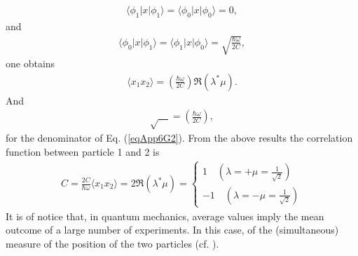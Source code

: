\begin{subappendices}
\begin{align}\label{eqApp6G4}
\langle\phi_1|x|\phi_1\rangle=\langle\phi_0|x|\phi_0\rangle=0,
\end{align} 
and
\begin{align}\label{eqApp6G5}
\langle\phi_0|x|\phi_1\rangle=\langle\phi_1|x|\phi_0\rangle=\sqrt{\frac{\hbar\omega}{2C}},
\end{align}
one obtains
\begin{align}\label{eqApp6G6}
\langle x_1x_2\rangle=\left(\frac{\hbar\omega}{2C}\right)\Re(\lambda^*\mu).
\end{align} 
And 
\begin{align}\label{eqApp6G7}
\sqrt{\quad}=\left(\frac{\hbar\omega}{2C}\right),
\end{align}
for the denominator of Eq. (\ref{eqApp6G2}).
From the above results the correlation function between particle 1 and 2 is
\begin{align}\label{eqApp6G8}
C=\frac{2C}{\hbar\omega}\langle x_1x_2\rangle=2\Re(\lambda^*\mu)=
\left\{
\begin{array}{c}
 1\quad (\lambda=+\mu=\frac{1}{\sqrt{2}})\\ 
 -1 \quad (\lambda=-\mu=\frac{1}{\sqrt{2}})
\end{array}
\right. 
\end{align}
It is of notice that, in quantum mechanics, average values imply the mean outcome of a large number of experiments. In this case, of the (simultaneous) measure of the position of the two particles (cf. \cite{Basdevant:05}).







\end{subappendices}
